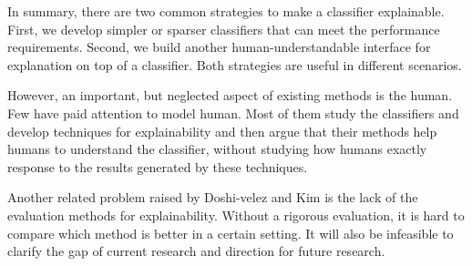 



In summary, there are two common strategies to make a classifier explainable. First, we develop simpler or sparser classifiers that can meet the performance requirements. Second, we build another human-understandable interface for explanation on top of a classifier. Both strategies are useful in different scenarios. 

However, an important, but neglected aspect of existing methods is the human. Few have paid attention to model human. Most of them study the classifiers and develop techniques for explainability and then argue that their methods help humans to understand the classifier, without studying how humans exactly response to the results generated by these techniques. 

Another related problem raised by Doshi-velez and Kim \cite{doshi-velez2017interpretableml} is the lack of the evaluation methods for explainability. Without a rigorous evaluation, it is hard to compare which method is better in a certain setting. It will also be infeasible to clarify the gap of current research and direction for future research.

\newpage